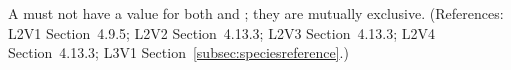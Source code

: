 A \SpeciesReference must not have a value for both 
and ; they are mutually exclusive.  (References:
L2V1 Section~4.9.5; L2V2 Section~4.13.3; L2V3 Section~4.13.3; L2V4 Section~4.13.3; 
L3V1 Section~\ref{subsec:speciesreference}.)

